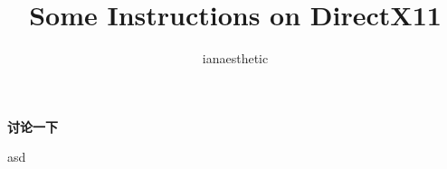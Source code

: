 \documentclass[10pt, a4paper]{article}
\author{ianaesthetic}
\title{Some Instructions on DirectX11}
\begin{document}
\maketitle
\newpage

\textbf{讨论一下}

asd
\end{document}
